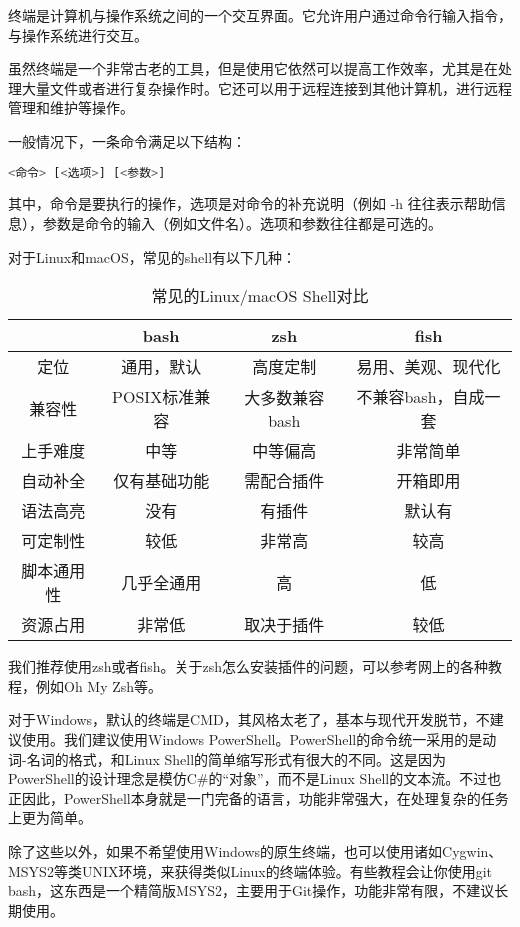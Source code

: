 终端是计算机与操作系统之间的一个交互界面。它允许用户通过命令行输入指令，与操作系统进行交互。

虽然终端是一个非常古老的工具，但是使用它依然可以提高工作效率，尤其是在处理大量文件或者进行复杂操作时。它还可以用于远程连接到其他计算机，进行远程管理和维护等操作。

一般情况下，一条命令满足以下结构：
\begin{lstlisting}[language=bash]
    <命令> [<选项>] [<参数>]
\end{lstlisting}

其中，命令是要执行的操作，选项是对命令的补充说明（例如 -h 往往表示帮助信息），参数是命令的输入（例如文件名）。选项和参数往往都是可选的。

对于Linux和macOS，常见的shell有以下几种：

\begin{table}[ht]
  \centering
  \begin{tabular}{c|ccc}
    \toprule
    & \textbf{bash} & \textbf{zsh} & \textbf{fish} \\
    \midrule
    定位 & 通用，默认 & 高度定制 & 易用、美观、现代化 \\
    兼容性 & POSIX标准兼容 & 大多数兼容bash & 不兼容bash，自成一套 \\
    上手难度 & 中等 & 中等偏高 & 非常简单 \\
    自动补全 & 仅有基础功能 & 需配合插件 & 开箱即用 \\
    语法高亮 & 没有 & 有插件 & 默认有 \\
    可定制性 & 较低 & 非常高 & 较高 \\
    脚本通用性 & 几乎全通用 & 高 & 低 \\
    资源占用 & 非常低 & 取决于插件 & 较低 \\
    \bottomrule
  \end{tabular}
  \caption{常见的Linux/macOS Shell对比}
\end{table}
我们推荐使用zsh或者fish。关于zsh怎么安装插件的问题，可以参考网上的各种教程，例如Oh My Zsh等。

对于Windows，默认的终端是CMD，其风格太老了，基本与现代开发脱节，不建议使用。我们建议使用Windows PowerShell。PowerShell的命令统一采用的是动词-名词的格式，和Linux Shell的简单缩写形式有很大的不同。这是因为PowerShell的设计理念是模仿C\#的“对象”，而不是Linux Shell的文本流。不过也正因此，PowerShell本身就是一门完备的语言，功能非常强大，在处理复杂的任务上更为简单。

除了这些以外，如果不希望使用Windows的原生终端，也可以使用诸如Cygwin、MSYS2等类UNIX环境，来获得类似Linux的终端体验。有些教程会让你使用git bash，这东西是一个精简版MSYS2，主要用于Git操作，功能非常有限，不建议长期使用。

